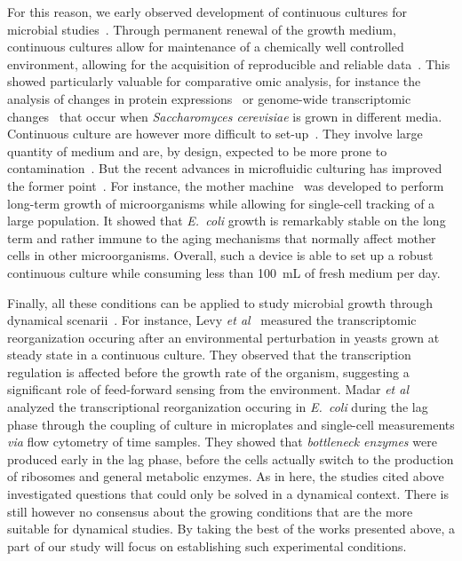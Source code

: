 For this reason, we early observed development of continuous cultures for microbial studies~\cite{myers_culture_1944,novick_experiments_1950,herbert_continuous_1956}.
Through permanent renewal of the growth medium, continuous cultures allow for maintenance of a chemically well controlled environment, allowing for the acquisition of reproducible and reliable data~\cite{borirak_molecular_2014,hoskisson_continuous_2005}.
This showed particularly valuable for comparative omic analysis, for instance the analysis of changes in protein expressions~\cite{kolkman_comparative_2005} or genome-wide transcriptomic changes~\cite{boer_genome-wide_2003} that occur when \textit{Saccharomyces cerevisiae} is grown in different media.
Continuous culture are however more difficult to set-up~\cite{novick_experiments_1950,borirak_molecular_2014}.
They involve large quantity of medium and are, by design, expected to be more prone to contamination~\cite{novick_experiments_1950}.
But the recent advances in microfluidic culturing has improved the former point~\cite{wang_robust_2010,balaban_bacterial_2004}.
For instance, the mother machine~\cite{wang_robust_2010} was developed to perform long-term growth of microorganisms while allowing for single-cell tracking of a large population.
It showed that \textit{E.~coli} growth is remarkably stable on the long term and rather immune to the aging mechanisms that normally affect mother cells in other microorganisms.
Overall, such a device is able to set up a robust continuous culture while consuming less than 100~mL of fresh medium per day.

Finally, all these conditions can be applied to study microbial growth through dynamical scenarii~\cite{levy_strategy_2007,levy_coordination_2009,madar_promoter_2013,ehrenberg_mediumdependent_2012}.
For instance, Levy \textit{et al}~\cite{levy_strategy_2007,levy_coordination_2009} measured the transcriptomic reorganization occuring after an environmental perturbation in yeasts grown at steady state in a continuous culture.
They observed that the transcription regulation is affected before the growth rate of the organism, suggesting a significant role of feed-forward sensing from the environment.
Madar \textit{et al}~\cite{madar_promoter_2013} analyzed the transcriptional reorganization occuring in \textit{E.~coli} during the lag phase through the coupling of culture in microplates and single-cell measurements \textit{via} flow cytometry of time samples.
They showed that \textit{bottleneck enzymes} were produced early in the lag phase, before the cells actually switch to the production of ribosomes and general metabolic enzymes.
As in here, the studies cited above investigated questions that could only be solved in a dynamical context.
There is still however no consensus about the growing conditions that are the more suitable for dynamical studies.
By taking the best of the works presented above, a part of our study will focus on establishing such experimental conditions.

